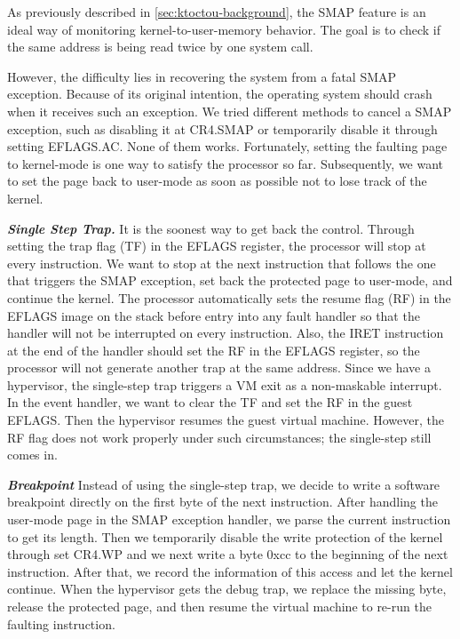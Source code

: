 As previously described in \autoref{sec:ktoctou-background}, the SMAP feature is an ideal way of monitoring kernel-to-user-memory behavior. The goal is to check if the same address is being read twice by one system call.

However, the difficulty lies in recovering the system from a fatal SMAP exception.  Because of its original intention, the operating system should crash when it receives such an exception. We tried different methods to cancel a SMAP exception, such as disabling it at CR4.SMAP or temporarily disable it through setting EFLAGS.AC. None of them works.  Fortunately, setting the faulting page to kernel-mode is one way to satisfy the processor so far. Subsequently, we want to set the page back to user-mode as soon as possible not to lose track of the kernel.



\textbf{\textit{Single Step Trap.}} It is the soonest way to get back the control. Through setting the trap flag (TF) in the EFLAGS register, the processor will stop at every instruction. We want to stop at the next instruction that follows the one that triggers the SMAP exception, set back the protected page to user-mode, and continue the kernel. The processor automatically sets the resume flag (RF) in the EFLAGS image on the stack before entry into any fault handler so that the handler will not be interrupted on every instruction. Also, the IRET instruction at the end of the handler should set the RF in the EFLAGS register, so the processor will not generate another trap at the same address. Since we have a hypervisor, the single-step trap triggers a VM exit as a non-maskable interrupt. In the event handler, we want to clear the TF and set the RF in the guest EFLAGS. Then the hypervisor resumes the guest virtual machine. However, the RF flag does not work properly under such circumstances; the single-step still comes in.

\textbf{\textit{Breakpoint}} Instead of using the single-step trap, we decide to write a software breakpoint directly on the first byte of the next instruction. After handling the user-mode page in the SMAP exception handler, we parse the current instruction to get its length. Then we temporarily disable the write protection of the kernel through set CR4.WP and we next write a byte 0xcc to the beginning of the next instruction. After that, we record the information of this access and let the kernel continue. When the hypervisor gets the debug trap, we replace the missing byte, release the protected page, and then resume the virtual machine to re-run the faulting instruction. 




